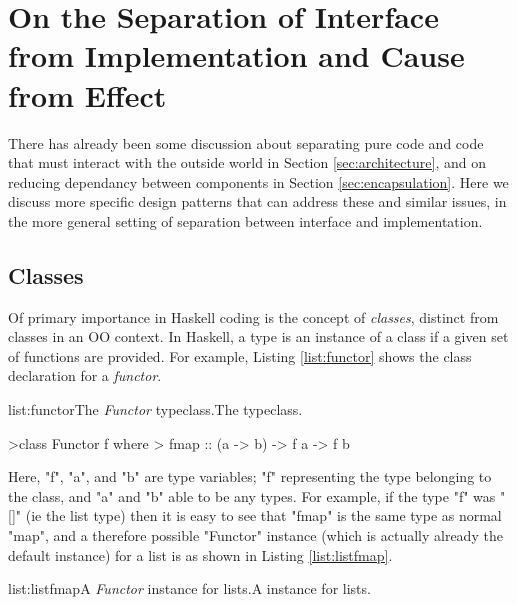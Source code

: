 \section[On the Separation of Interface from Implementation and Cause from Effect]{On the Separation of Interface from Implementation and Cause from Effect}
\label{sec:pure}

There has already been some discussion about separating pure code and code that must interact with the outside world in Section \ref{sec:architecture}, and on reducing dependancy between components in Section \ref{sec:encapsulation}. Here we discuss more specific design patterns that can address these and similar issues, in the more general setting of separation between interface and implementation.

\subsection{Classes}

Of primary importance in Haskell coding is the concept of \emph{classes}, distinct from classes in an OO context. In Haskell, a type is an instance of a class if a given set of functions are provided. For example, Listing \ref{list:functor} shows the class declaration for a \emph{functor}.

\vspace{-0.5em}
\begin{listing}{list:functor}{The \emph{Functor} typeclass.}{The  typeclass.}{}
\end{listing}\vspace{-1.5em}

\begin{haskell}
>class Functor f where
>  fmap :: (a -> b) -> f a -> f b

\end{haskell}
\noindent Here, "f", "a", and "b" are type variables; "f" representing the type belonging to the class, and "a" and "b" able to be any types. For example, if the type "f" was "[]" (ie the list type) then it is easy to see that "fmap" is the same type as normal "map", and a therefore possible "Functor" instance (which is actually already the default instance) for a list is as shown in Listing \ref{list:listfmap}.

\vspace{-0.5em}
\begin{listing}{list:listfmap}{A \emph{Functor} instance for lists.}{A  instance for lists.}{}
\end{listing}\vspace{-1.5em}

